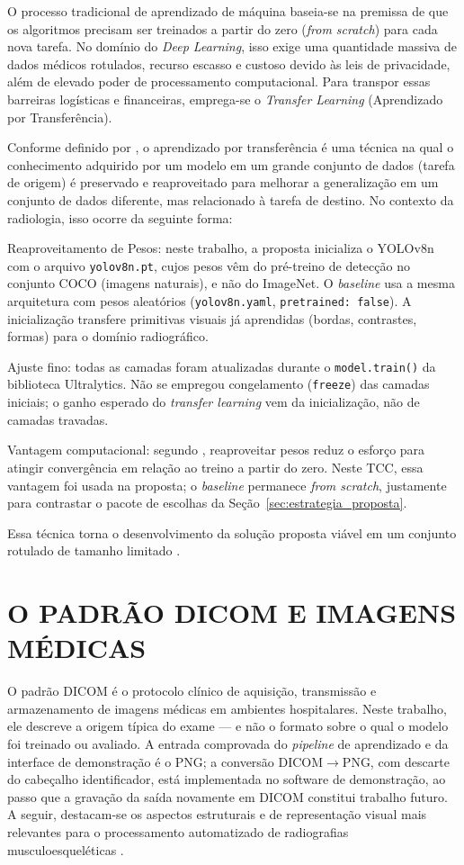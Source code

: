 \documentclass[12pt,oneside,a4paper,chapter=TITLE,section=TITLE,sumario=tradicional]{abntex2}
\begin{document}
O processo tradicional de aprendizado de máquina baseia-se na premissa de que os algoritmos precisam ser treinados a partir do zero (\textit{from scratch}) para cada nova tarefa. No domínio do \textit{Deep Learning}, isso exige uma quantidade massiva de dados médicos rotulados, recurso escasso e custoso devido às leis de privacidade, além de elevado poder de processamento computacional. Para transpor essas barreiras logísticas e financeiras, emprega-se o \textit{Transfer Learning} (Aprendizado por Transferência).

Conforme definido por , o aprendizado por transferência é uma técnica na qual o conhecimento adquirido por um modelo em um grande conjunto de dados (tarefa de origem) é preservado e reaproveitado para melhorar a generalização em um conjunto de dados diferente, mas relacionado à tarefa de destino. No contexto da radiologia, isso ocorre da seguinte forma:

Reaproveitamento de Pesos: neste trabalho, a proposta inicializa o YOLOv8n com o arquivo \texttt{yolov8n.pt}, cujos pesos vêm do pré-treino de detecção no conjunto COCO (imagens naturais), e não do ImageNet. O \textit{baseline} usa a mesma arquitetura com pesos aleatórios (\texttt{yolov8n.yaml}, \texttt{pretrained: false}). A inicialização transfere primitivas visuais já aprendidas (bordas, contrastes, formas) para o domínio radiográfico.

Ajuste fino: todas as camadas foram atualizadas durante o \texttt{model.train()} da biblioteca Ultralytics. Não se empregou congelamento (\texttt{freeze}) das camadas iniciais; o ganho esperado do \textit{transfer learning} vem da inicialização, não de camadas travadas.

Vantagem computacional: segundo , reaproveitar pesos reduz o esforço para atingir convergência em relação ao treino a partir do zero. Neste TCC, essa vantagem foi usada na proposta; o \textit{baseline} permanece \textit{from scratch}, justamente para contrastar o pacote de escolhas da Seção~\ref{sec:estrategia_proposta}.

Essa técnica torna o desenvolvimento da solução proposta viável em um conjunto rotulado de tamanho limitado \cite{zhou2020,ibm2024,jocher2023ultralytics}.

\section{O PADRÃO DICOM E IMAGENS MÉDICAS}

O padrão DICOM é o protocolo clínico de aquisição, transmissão e armazenamento de imagens médicas em ambientes hospitalares. Neste trabalho, ele descreve a origem típica do exame --- e não o formato sobre o qual o modelo foi treinado ou avaliado. A entrada comprovada do \textit{pipeline} de aprendizado e da interface de demonstração é o PNG; a conversão DICOM$\rightarrow$PNG, com descarte do cabeçalho identificador, está implementada no software de demonstração, ao passo que a gravação da saída novamente em DICOM constitui trabalho futuro. A seguir, destacam-se os aspectos estruturais e de representação visual mais relevantes para o processamento automatizado de radiografias musculoesqueléticas \cite{dicomstandard2024,zhou2020}.
\end{document}
